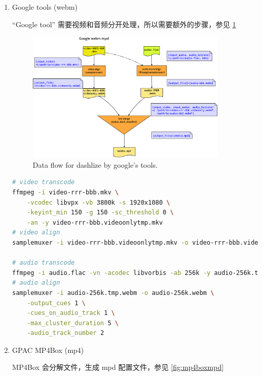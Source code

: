 \begin{enumerate}
  \item Google tools (webm)

``Google tool'' 需要视频和音频分开处理，所以需要额外的步骤，参见 \ref{fig:googletoolmpd}

\begin{figure}\centering
  \includegraphics[width=0.9\textwidth]{figures-appconv2dash/flowchart-1-googletoolmpd.eps}
  \caption{Data flow for dashlize by google's tools.}\label{fig:googletoolmpd}
\end{figure}

\begin{lstlisting}[language=bash]
# video transcode
ffmpeg -i video-rrr-bbb.mkv \
    -vcodec libvpx -vb 3800k -s 1920x1080 \
    -keyint_min 150 -g 150 -sc_threshold 0 \
    -an -y video-rrr-bbb.videoonlytmp.mkv
# video align
samplemuxer -i video-rrr-bbb.videoonlytmp.mkv -o video-rrr-bbb.videoonly.mkv

# audio transcode
ffmpeg -i audio.flac -vn -acodec libvorbis -ab 256k -y audio-256k.tmp.webm
# audio align
samplemuxer -i audio-256k.tmp.webm -o audio-256k.webm \
    -output_cues 1 \
    -cues_on_audio_track 1 \
    -max_cluster_duration 5 \
    -audio_track_number 2
\end{lstlisting}

  \item {GPAC MP4Box (mp4)}

MP4Box 会分解文件，生成 mpd 配置文件，参见 \ref{fig:mp4boxmpd}


\end{enumerate}
